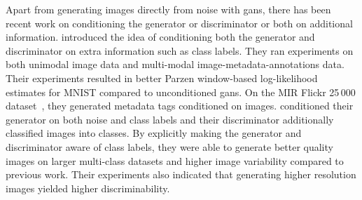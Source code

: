 \documentclass{article}
\begin{document}
Apart from generating images directly from noise with \glspl{gan}, there has been recent work on conditioning the generator or discriminator or both on additional information. \citet{cgan} introduced the idea of conditioning both the generator and discriminator on extra information such as class labels. They ran experiments on both unimodal image data and multi-modal image\nobreakdash-metadata\nobreakdash-annotations data. Their experiments resulted in better Parzen window-based log-likelihood estimates for MNIST compared to unconditioned \glspl{gan}. On the MIR Flickr 25\,000 dataset~\cite{huiskes08}, they generated metadata tags conditioned on images. \citet{acgan} conditioned their generator on both noise and class labels and their discriminator additionally classified images into classes. By explicitly making the generator and discriminator aware of class labels, they were able to generate better quality images on larger multi-class datasets and higher image variability compared to previous work. Their experiments also indicated that generating higher resolution images yielded higher discriminability.
\end{document}
